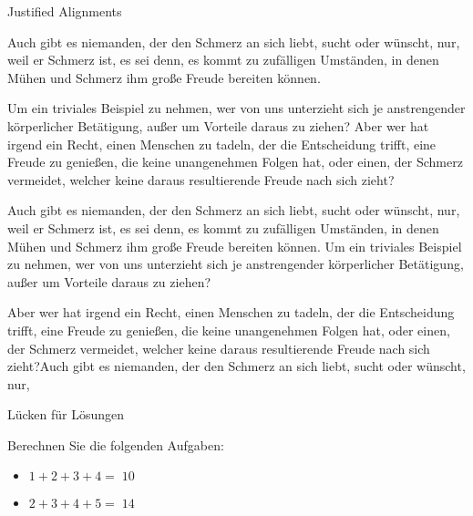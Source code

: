 \documentclass[
  ignorenonframetext,
]{beamer}
\providecommand{\tightlist}{%
  \setlength{\itemsep}{0pt}\setlength{\parskip}{0pt}}
\begin{document}
\begin{frame}{Justified Alignments}
\protect\hypertarget{justified-alignments}{}

{\tiny{}

Auch gibt es niemanden, der den Schmerz an sich liebt, sucht oder
wünscht, nur, weil er Schmerz ist, es sei denn, es kommt zu zufälligen
Umständen, in denen Mühen und Schmerz ihm große Freude bereiten können.


\begin{flushright}

Um ein triviales Beispiel zu nehmen, wer von uns unterzieht sich je
anstrengender körperlicher Betätigung, außer um Vorteile daraus zu
ziehen? Aber wer hat irgend ein Recht, einen Menschen zu tadeln, der die
Entscheidung trifft, eine Freude zu genießen, die keine unangenehmen
Folgen hat, oder einen, der Schmerz vermeidet, welcher keine daraus
resultierende Freude nach sich zieht?


\end{flushright}


\begin{flushleft}

Auch gibt es niemanden, der den Schmerz an sich liebt, sucht oder
wünscht, nur, weil er Schmerz ist, es sei denn, es kommt zu zufälligen
Umständen, in denen Mühen und Schmerz ihm große Freude bereiten können.
Um ein triviales Beispiel zu nehmen, wer von uns unterzieht sich je
anstrengender körperlicher Betätigung, außer um Vorteile daraus zu
ziehen?


\end{flushleft}

Aber wer hat irgend ein Recht, einen Menschen zu tadeln, der die
Entscheidung trifft, eine Freude zu genießen, die keine unangenehmen
Folgen hat, oder einen, der Schmerz vermeidet, welcher keine daraus
resultierende Freude nach sich zieht?Auch gibt es niemanden, der den
Schmerz an sich liebt, sucht oder wünscht, nur,

}

\end{frame}

\begin{frame}{Lücken für Lösungen}
\protect\hypertarget{lucken-fur-losungen}{}

Berechnen Sie die folgenden Aufgaben:

\begin{itemize}
\tightlist
\item
  \(1+2+3+4=\;\){\(10\)}
\item
  \(2+3+4+5=\;\){\(14\)}
\end{itemize}

\end{frame}
\end{document}
